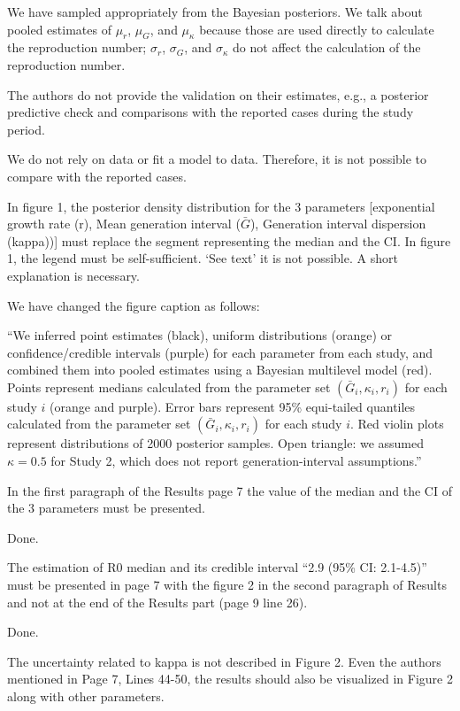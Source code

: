 \documentclass[12pt]{article}
\newcommand{\revtext}{\textsf}
\begin{document}
We have sampled appropriately from the Bayesian posteriors. We talk about pooled estimates of $\mu_r$, $\mu_G$, and $\mu_\kappa$ because those are used directly to calculate the reproduction number; $\sigma_r$, $\sigma_G$, and
$\sigma_\kappa$ do not affect the calculation of the reproduction number.

\revtext{The authors do not provide the validation on their estimates, e.g., a posterior predictive check
and comparisons with the reported cases during the study period.}

We do not rely on data or fit a model to data. Therefore, it is not possible to compare with the reported cases.

\revtext{In figure 1, the posterior density distribution for the 3 parameters [exponential growth rate (r),
Mean generation interval ($\bar G$), Generation interval dispersion (kappa))] must replace the
segment representing the median and the CI. In figure 1, the legend must be self-sufficient. ‘See
text’ it is not possible. A short explanation is necessary.}

We have changed the figure caption as follows:

``We inferred point estimates (black), uniform distributions (orange) or confidence/credible intervals (purple) for each parameter from each study, and combined them into pooled estimates using a Bayesian multilevel model (red).
Points represent medians calculated from the parameter set $(\bar{G}_{i}, \kappa_{i}, r_{i})$ for each study $i$ (orange and purple).
Error bars represent 95\% equi-tailed quantiles calculated from the parameter set $(\bar{G}_{i}, \kappa_{i}, r_{i})$ for each study $i$.
Red violin plots represent distributions of 2000 posterior samples.
Open triangle: we assumed $\kappa=0.5$ for Study 2, which does not report generation-interval assumptions.''

\revtext{In the first paragraph of the Results page 7 the value of the median and the CI of the 3
parameters must be presented.}

Done.

\revtext{The estimation of R0 median and its credible interval “2.9 (95\% CI: 2.1-4.5)” must be presented
in page 7 with the figure 2 in the second paragraph of Results and not at the end of the Results
part (page 9 line 26).}

Done.

\revtext{The uncertainty related to kappa is not described in Figure 2. Even the authors mentioned in
Page 7, Lines 44-50, the results should also be visualized in Figure 2 along with other
parameters.}
\end{document}
